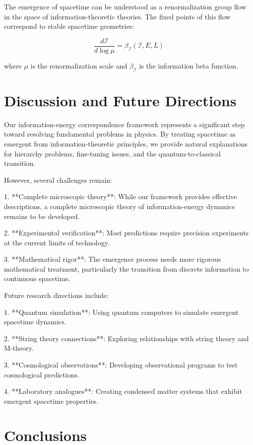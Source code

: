 \documentclass[11pt,a4paper]{article}
\begin{document}
The emergence of spacetime can be understood as a renormalization group flow in the space of information-theoretic theories. The fixed points of this flow correspond to stable spacetime geometries:

\begin{equation}
\frac{d\mathcal{I}}{d\log \mu} = \beta_{\mathcal{I}}(\mathcal{I}, E, L)
\end{equation}

where $\mu$ is the renormalization scale and $\beta_{\mathcal{I}}$ is the information beta function.

\section{Discussion and Future Directions}

Our information-energy correspondence framework represents a significant step toward resolving fundamental problems in physics. By treating spacetime as emergent from information-theoretic principles, we provide natural explanations for hierarchy problems, fine-tuning issues, and the quantum-to-classical transition.

However, several challenges remain:

1. **Complete microscopic theory**: While our framework provides effective descriptions, a complete microscopic theory of information-energy dynamics remains to be developed.

2. **Experimental verification**: Most predictions require precision experiments at the current limits of technology.

3. **Mathematical rigor**: The emergence process needs more rigorous mathematical treatment, particularly the transition from discrete information to continuous spacetime.

Future research directions include:

1. **Quantum simulation**: Using quantum computers to simulate emergent spacetime dynamics.

2. **String theory connections**: Exploring relationships with string theory and M-theory.

3. **Cosmological observations**: Developing observational programs to test cosmological predictions.

4. **Laboratory analogues**: Creating condensed matter systems that exhibit emergent spacetime properties.

\section{Conclusions}
\end{document}
